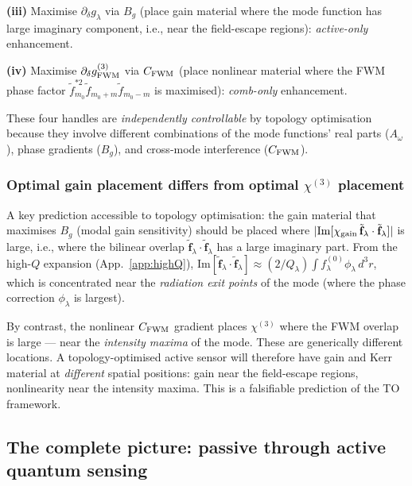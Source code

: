 \documentclass[12pt]{article}
\newcommand{\tf}{\tilde{\mathbf{f}}}
\begin{document}
\textbf{(iii)} Maximise $\partial_\delta g_\lambda$ via $B_g$ (place gain
material where the mode function has large imaginary component, i.e.,
near the field-escape regions):  \emph{active-only} enhancement.

\textbf{(iv)} Maximise $\partial_\delta g^{(3)}_{\rm FWM}$ via $C_{\rm FWM}$
(place nonlinear material where the FWM phase factor
$\tilde{f}_{m_0}^{*2}\tilde{f}_{m_0+m}\tilde{f}_{m_0-m}$ is maximised):
\emph{comb-only} enhancement.

These four handles are \emph{independently controllable} by topology
optimisation because they involve different combinations of the mode
functions' real parts ($A_\omega$), phase gradients ($B_g$), and
cross-mode interference ($C_{\rm FWM}$).

\subsubsection*{Optimal gain placement differs from optimal $\chi^{(3)}$ placement}

A key prediction accessible to topology optimisation:  the gain material
that maximises $B_g$ (modal gain sensitivity) should be placed where
$|\mathrm{Im}[\chi_{\rm gain}\,\tf_\lambda\cdot\tf_\lambda]|$ is large,
i.e., where the bilinear overlap $\tf_\lambda\cdot\tf_\lambda$ has a large
imaginary part.  From the high-$Q$ expansion (App.~\ref{app:highQ}),
$\mathrm{Im}[\tf_\lambda\cdot\tf_\lambda] \approx (2/Q_\lambda)\int
f^{(0)}_\lambda\phi_\lambda\,d^3r$, which is concentrated near the
\emph{radiation exit points} of the mode (where the phase correction
$\phi_\lambda$ is largest).

By contrast, the nonlinear $C_{\rm FWM}$ gradient places $\chi^{(3)}$
where the FWM overlap is large --- near the \emph{intensity maxima} of
the mode.  These are generically different locations.  A topology-optimised
active sensor will therefore have gain and Kerr material at \emph{different}
spatial positions: gain near the field-escape regions, nonlinearity near
the intensity maxima.  This is a falsifiable prediction of the TO framework.

\subsection{The complete picture: passive through active quantum sensing}
\end{document}

